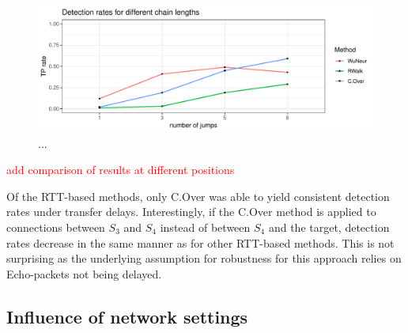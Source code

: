 \documentclass[runningheads]{llncs}\usepackage[]{graphicx}\usepackage[]{color}
\makeatletter
\def\maxwidth{ %
  \ifdim\Gin@nat@width>\linewidth
    \linewidth
  \else
    \Gin@nat@width
  \fi
}
\newenvironment{knitrout}{}{} %
\makeatother
\begin{document}
\begin{knitrout}
\color{fgcolor}\begin{figure}
\includegraphics[width=\maxwidth]{figure/Influencechainl-1} \caption[..]{...}\label{fig:Influencechainl}
\end{figure}


\end{knitrout}

\textcolor{red}{add comparison of results at different positions}

Of the RTT-based methods, only C.Over was able to yield consistent detection rates under transfer delays. 
Interestingly, if the C.Over method is applied to connections between $S_3$ and $S_4$ instead of between $S_4$ and the target, detection rates decrease in the same manner as for other RTT-based methods. This is not surprising as the underlying assumption for robustness for this approach relies on Echo-packets not being delayed.




\subsection{Influence of network settings}
\end{document}
